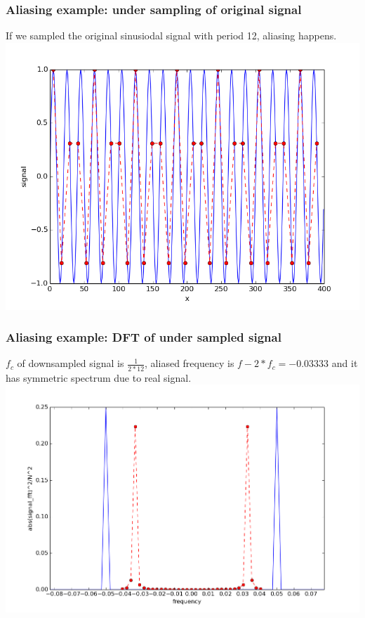 \documentclass{beamer}
\begin{document}
\begin{frame}
\frametitle{Aliasing example: under sampling of original signal}
If we sampled the original sinusiodal signal with period 12, aliasing happens.\\
\includegraphics[scale=0.4]{undersample12.png}
\end{frame}
\begin{frame}
\frametitle{Aliasing example: DFT of under sampled signal}
$f_c$ of downsampled signal is $\frac{1}{2*12}$, aliased frequency is $f - 2*f_c = -0.03333$ and it has symmetric spectrum due to real signal.
\includegraphics[scale=0.4]{undersample12_dft.png}
\end{frame}
\end{document}
